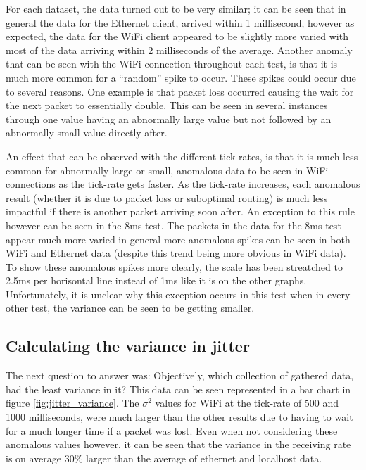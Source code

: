 For each dataset, the data turned out to be very similar; it can be seen that in general the data for the Ethernet client, arrived within 1 millisecond, however as expected, the data for the WiFi client appeared to be slightly more varied with most of the data arriving within 2 milliseconds of the average. Another anomaly that can be seen with the WiFi connection throughout each test, is that it is much more common for a ``random'' spike to occur. These spikes could occur due to several reasons. One example is that packet loss occurred causing the wait for the next packet to essentially double. This can be seen in several instances through one value having an abnormally large value but not followed by an abnormally small value directly after.

An effect that can be observed with the different tick-rates, is that it is much less common for abnormally large or small, anomalous data to be seen in WiFi connections as the tick-rate gets faster. As the tick-rate increases, each anomalous result (whether it is due to packet loss or suboptimal routing) is much less impactful if there is another packet arriving soon after. An exception to this rule however can be seen in the 8ms test. The packets in the data for the 8ms test appear much more varied in general more anomalous spikes can be seen in both WiFi and Ethernet data (despite this trend being more obvious in WiFi data). To show these anomalous spikes more clearly, the scale has been streatched to 2.5ms per horisontal line instead of 1ms like it is on the other graphs. Unfortunately, it is unclear why this exception occurs in this test when in every other test, the variance can be seen to be getting smaller.

\newpage



\subsection{Calculating the variance in jitter}\label{sec:variance_results}
The next question to answer was: Objectively, which collection of gathered data, had the least variance in it? This data can be seen represented in a bar chart in figure \ref{fig:jitter_variance}. The $\sigma^2$ values for WiFi at the tick-rate of 500 and 1000 milliseconds, were much larger than the other results due to having to wait for a much longer time if a packet was lost. Even when not considering these anomalous values however, it can be seen that the variance in the receiving rate is on average 30\% larger than the average of ethernet and localhost data.

